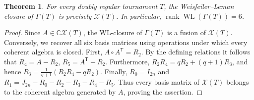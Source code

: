 \documentclass[10pt,a4paper]{amsart}
\newtheorem{theorem}{Theorem}
\begin{document}
\begin{theorem}
\label{thm:wl}
For every doubly regular tournament $T$, the Weisfeiler--Leman closure of
$\Gamma(T)$ is precisely $\mathcal X(T)$.  In particular,
$ \operatorname{rank}\operatorname{WL}(\Gamma(T))=6$.
\end{theorem}

\begin{proof}
Since $A\in\mathbb C\mathcal X(T)$, the WL-closure of $\Gamma(T)$ is a fusion
of $\mathcal X(T)$.  Conversely, we recover all six basis matrices using
operations under which every coherent algebra is closed.  First,
$A\circ A^{\mathsf T}=R_2$.
By the defining relations it follows that
$R_4=A-R_2$, $R_5=A^{\mathsf T}-R_2$.
Furthermore, 
$R_2R_4=qR_2+(q+1)R_3$,
and hence
$ R_3=\frac{1}{q+1}(R_2R_4-qR_2)$.
Finally, $R_0=I_{2n}$ and
$R_1=J_{2n}-R_0-R_2-R_3-R_4-R_5$.
Thus every basis matrix of $\mathcal X(T)$ belongs to the coherent algebra
generated by $A$, proving the assertion.
\end{proof}
\end{document}
